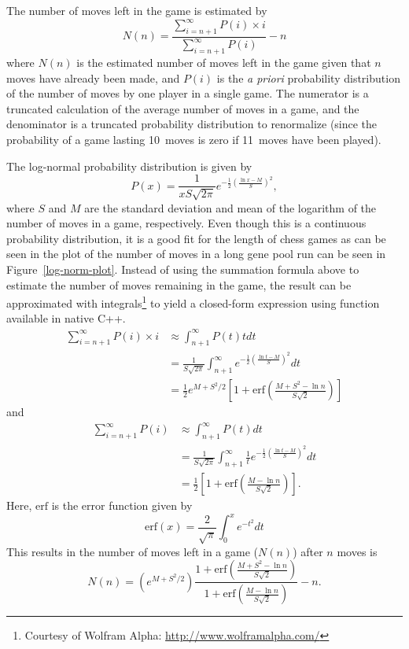 \documentclass[letterpaper]{article}
\newcommand{\cpp}{C{\nobreak+}{\nobreak+}}
\renewcommand{\_}{\allowbreak\textunderscore\allowbreak}
\begin{document}
The number of moves left in the game is estimated by
\[N(n) = \frac{\sum_{i = n + 1}^\infty P(i)\times{}i}{\sum_{i = n + 1}^\infty P(i)} - n\]
where \(N(n)\) is the estimated number of moves left in the game given that \(n\) moves have already been made, and \(P(i)\) is the \emph{a priori} probability distribution of the number of moves by one player in a single game. The numerator is a truncated calculation of the average number of moves in a game, and the denominator is a truncated probability distribution to renormalize (since the probability of a game lasting 10~moves is zero if 11~moves have been played).

The log-normal probability distribution is given by
\[P(x) = \frac{1}{xS\sqrt{2\pi}} e^{-\frac{1}{2}{\left(\frac{\ln{x} - M}{S}\right)}^2},\]
where \(S\) and \(M\) are the standard deviation and mean of the logarithm of the number of moves in a game, respectively. Even though this is a continuous probability distribution, it is a good fit for the length of chess games as can be seen in the plot of the number of moves in a long gene pool run can be seen in Figure~\ref{log-norm-plot}. Instead of using the summation formula above to estimate the number of moves remaining in the game, the result can be approximated with integrals\footnote{Courtesy of Wolfram Alpha: \url{http://www.wolframalpha.com/}} to yield a closed-form expression using function available in native \cpp.
\begin{align*}
\sum_{i = n + 1}^\infty P(i)\times{}i &\approx \int_{n+1}^\infty P(t)t dt \\
	&= \frac{1}{S\sqrt{2\pi}} \int_{n+1}^\infty e^{-\frac{1}{2}{\left(\frac{\ln{t} - M}{S}\right)}^2}dt\\
	&= \frac{1}{2}e^{M + S^2/2}{\left[1 + \textrm{erf}{\left(\frac{M + S^2 - \ln n}{S\sqrt{2}}\right)}\right]}
\end{align*}
and
\begin{align*}
\sum_{i = n + 1}^\infty P(i) &\approx \int_{n+1}^\infty P(t)dt \\
	&= \frac{1}{S\sqrt{2\pi}} \int_{n+1}^\infty \frac{1}{t} e^{-\frac{1}{2}{\left(\frac{\ln{t} - M}{S}\right)}^2}dt \\
	&= \frac{1}{2}\left[1 + \textrm{erf}\left(\frac{M-\ln n}{S\sqrt{2}}\right)\right].
\end{align*}
Here, \(\textrm{erf}\) is the error function given by
\[
\textrm{erf}(x) = \frac{2}{\sqrt{\pi}}\int_0^x e^{-t^2}dt
\]
This results in the number of moves left in a game (\(N(n)\)) after \(n\) moves is
\[
N(n) = \left(e^{M + S^2/2}\right) \frac
{1 + \textrm{erf}\left(\frac{M + S^2 - \ln n}{S\sqrt{2}}\right)}
{1 + \textrm{erf}\left(\frac{M-\ln n}{S\sqrt{2}}\right)}
- n.
\]
\end{document}
